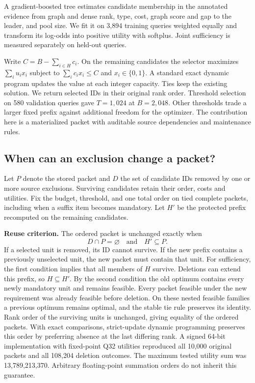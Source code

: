 \documentclass[conference]{IEEEtran}
\begin{document}
A gradient-boosted tree estimates candidate membership in the annotated evidence from graph and dense rank, type, cost, graph score and gap to the leader, and pool size. We fit it on 3,894 training queries weighted equally and transform its log-odds into positive utility with softplus. Joint sufficiency is measured separately on held-out queries.

Write $C=B-\sum_{i\in H} c_i$. On the remaining candidates the selector maximizes $\sum_i u_i x_i$ subject to $\sum_i c_i x_i\leq C$ and $x_i\in\{0,1\}$. A standard exact dynamic program updates the value at each integer capacity. Ties keep the existing solution. We return selected IDs in their original rank order. Threshold selection on 580 validation queries gave $T=1,024$ at $B=2,048$. Other thresholds trade a larger fixed prefix against additional freedom for the optimizer. The contribution here is a materialized packet with auditable source dependencies and maintenance rules.

\subsection{When can an exclusion change a packet?}
Let $P$ denote the stored packet and $D$ the set of candidate IDs removed by one or more source exclusions. Surviving candidates retain their order, costs and utilities. Fix the budget, threshold, and one total order on tied complete packets, including when a suffix item becomes mandatory. Let $H'$ be the protected prefix recomputed on the remaining candidates.

\textbf{Reuse criterion.} The ordered packet is unchanged exactly when
\[
           D\cap P=\varnothing \quad\text{and}\quad H'\subseteq P.
\]
If a selected unit is removed, its ID cannot survive. If the new prefix contains a previously unselected unit, the new packet must contain that unit. For sufficiency, the first condition implies that all members of $H$ survive. Deletions can extend this prefix, so $H\subseteq H'$. By the second condition the old optimum contains every newly mandatory unit and remains feasible. Every packet feasible under the new requirement was already feasible before deletion. On these nested feasible families a previous optimum remains optimal, and the stable tie rule preserves its identity. Rank order of the surviving units is unchanged, giving equality of the ordered packets. With exact comparisons, strict-update dynamic programming preserves this order by preferring absence at the last differing rank. A signed 64-bit implementation with fixed-point Q32 utilities reproduced all 10,000 original packets and all 108,204 deletion outcomes. The maximum tested utility sum was 13,789,213,370. Arbitrary floating-point summation orders do not inherit this guarantee.
\end{document}
